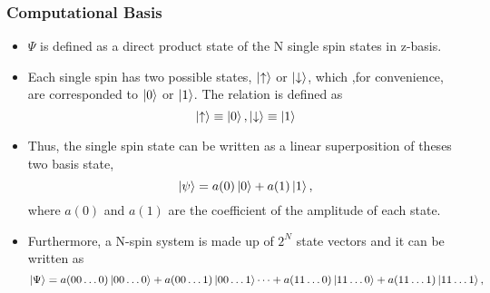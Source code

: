 \documentclass{beamer}
\begin{document}
\begin{frame}
	\frametitle{Computational Basis}
	\begin{itemize}
		\item $\Psi$ is defined as a direct product state of the N single spin states in z-basis.
		
		\item Each single spin has two possible states, $\ket{\uparrow}$ or $\ket{\downarrow}$, which ,for convenience, are corresponded to $\ket{0}$ or $\ket{1}$. The relation is defined as 	
		\begin{equation*}
		\ket{\uparrow}\equiv \ket{0}, \ket{\downarrow} \equiv \ket{1}
		\end{equation*}
		
		\item 
		Thus, the single spin state can be written as a linear superposition of theses two basis state, 	
		\begin{equation*}
		\ket{\psi} = a(0)\ket{0} + a(1)\ket{1},
		\end{equation*}
		where $a(0)$ and $a(1)$ are the coefficient of the amplitude of each state.
		
		\item Furthermore, a N-spin system is made up of $2^N$ state vectors and it can be written as 	
		\begin{equation*}
		\label{psi_in_compuationalbasis}
		\ket{\Psi} = a(00\dots0)\ket{00\dots0}+a(00\dots1)\ket{00\dots1}\cdots +a(11\dots0)\ket{11\dots0}+a(11\dots1)\ket{11\dots1},
		\end{equation*}
		
	\end{itemize}

\end{frame}
\end{document}
